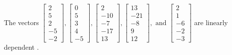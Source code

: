 \begin{exercise}
\begin{exerciseStatement}
  \end{exerciseStatement}
  \begin{exerciseAnswer}
   The vectors \(\left[\begin{array}{r}
2 \\
5 \\
2 \\
-5 \\
-2
\end{array}\right] , \left[\begin{array}{r}
0 \\
5 \\
3 \\
4 \\
-5
\end{array}\right] , \left[\begin{array}{r}
2 \\
-10 \\
-7 \\
-17 \\
13
\end{array}\right] , \left[\begin{array}{r}
13 \\
-21 \\
-8 \\
9 \\
12
\end{array}\right] , \text{ and } \left[\begin{array}{r}
2 \\
1 \\
-6 \\
-2 \\
-3
\end{array}\right]\) are 
  	 linearly dependent  .
  


  \end{exerciseAnswer}
\end{exercise}